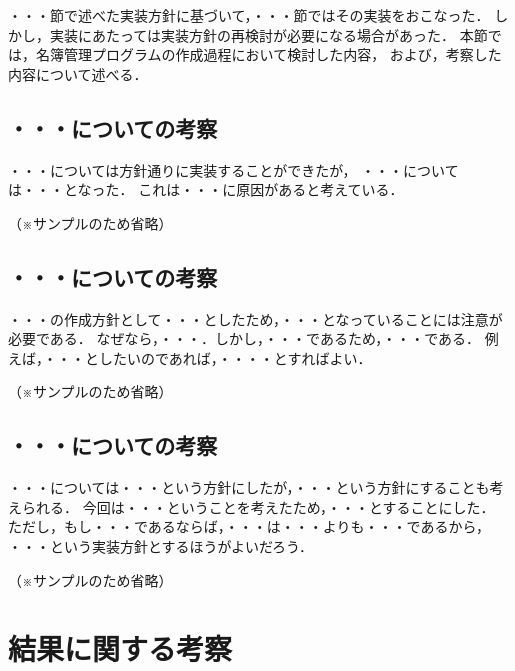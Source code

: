 \documentclass[a4j,11pt]{jarticle}
\begin{document}
・・・節で述べた実装方針に基づいて，・・・節ではその実装をおこなった．
しかし，実装にあたっては実装方針の再検討が必要になる場合があった．
本節では，名簿管理プログラムの作成過程において検討した内容，
および，考察した内容について述べる．

\subsection{・・・についての考察}

・・・については方針通りに実装することができたが，
・・・については・・・となった．
これは・・・に原因があると考えている．

（※サンプルのため省略）

\subsection{・・・についての考察}

・・・の作成方針として・・・としたため，・・・となっていることには注意が必要である．
なぜなら，・・・．しかし，・・・であるため，・・・である．
例えば，・・・としたいのであれば，・・・・とすればよい．

（※サンプルのため省略）

\subsection{・・・についての考察}

・・・については・・・という方針にしたが，・・・という方針にすることも考えられる．
今回は・・・ということを考えたため，・・・とすることにした．
ただし，もし・・・であるならば，・・・は・・・よりも・・・であるから，
・・・という実装方針とするほうがよいだろう．

（※サンプルのため省略）


\section{結果に関する考察}
\end{document}
